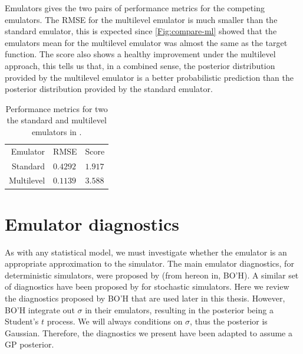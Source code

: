 \begin{chapter}{Emulators \label{Ch:Emulators}}
 gives the two pairs of performance metrics for the competing emulators. The RMSE for the multilevel emulator is much smaller than the standard emulator, this is expected since \cref{Fig:compare-ml} showed that the emulators mean for the multilevel emulator was almost the same as the target function. The score also shows a healthy improvement under the multilevel approach, this tells us that, in a combined sense, the posterior distribution provided by the multilevel emulator is a better probabilistic prediction than the posterior distribution provided by the standard emulator.
\begin{table}[h]
\centering
  \begin{tabular}{rll}
    \toprule
    Emulator & RMSE & Score \\ \cmidrule{1-3}
    Standard&$0.4292$&$1.917$\\
    Multilevel&$0.1139$&$3.588$\\
    \bottomrule
  \end{tabular}
  \caption{Performance metrics for two the standard and multilevel emulators in .}
  \label{Tab:toy-ml-metric}
\end{table}
\section{Emulator diagnostics}
As with any statistical model, we must investigate whether the emulator is an appropriate approximation to the simulator. The main emulator diagnostics, for deterministic simulators, were proposed by \citet{Bastos09} (from hereon in, BO'H). A similar set of diagnostics have been proposed by \citet{Baker2019a} for stochastic simulators.
Here we review the diagnostics proposed by BO'H that are used later in this thesis. However, BO'H integrate out $\sigma$ in their emulators, resulting in the posterior being a Student's $t$ process. We will always conditions on $\sigma$, thus the posterior is Gaussian. Therefore, the diagnostics we present have been adapted to assume a GP posterior.

\end{chapter}
